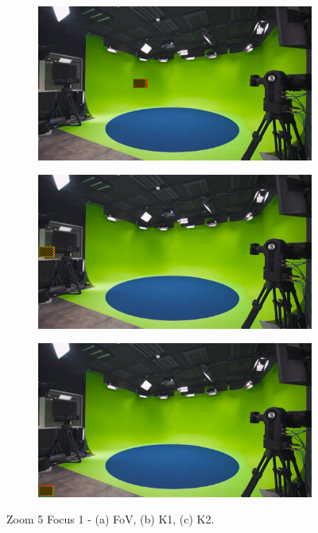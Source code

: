 \begin{figure}[h]
    \centering
    \begin{subfigure}[b]{0.45\textwidth}
        \includegraphics[width=\textwidth]{Images/08annex/results/9.2.png}
        \caption{}
        \label{fig:a2}
    \end{subfigure}
    \hfill
    \begin{subfigure}[b]{0.45\textwidth}
        \includegraphics[width=\textwidth]{Images/08annex/results/9.3.png}
        \caption{}
        \label{fig:b2}
    \end{subfigure}
    
    \vspace{0.5cm}
    
    \begin{subfigure}[b]{0.45\textwidth}
        \includegraphics[width=\textwidth]{Images/08annex/results/9.4.png}
        \caption{}
        \label{fig:c2}
    \end{subfigure}

    \caption{Zoom 5 Focus 1 - (a) FoV, (b) K1, (c) K2.}
    \label{fig:vir_fov_cal}
\end{figure}

